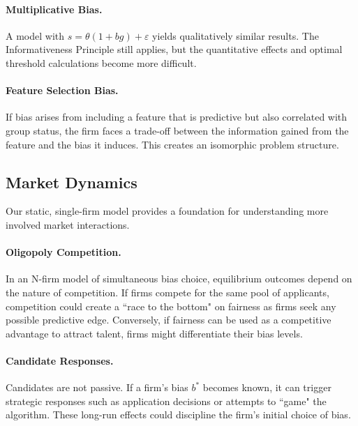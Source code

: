 \paragraph{Multiplicative Bias.} A model with $s = \theta(1+bg) + \varepsilon$ yields qualitatively similar results. The Informativeness Principle still applies, but the quantitative effects and optimal threshold calculations become more difficult.

\paragraph{Feature Selection Bias.} If bias arises from including a feature that is predictive but also correlated with group status, the firm faces a trade-off between the information gained from the feature and the bias it induces. This creates an isomorphic problem structure.

\subsection{Market Dynamics}
Our static, single-firm model provides a foundation for understanding more involved market interactions.

\paragraph{Oligopoly Competition.} In an N-firm model of simultaneous bias choice, equilibrium outcomes depend on the nature of competition. If firms compete for the same pool of applicants, competition could create a ``race to the bottom" on fairness as firms seek any possible predictive edge. Conversely, if fairness can be used as a competitive advantage to attract talent, firms might differentiate their bias levels.

\paragraph{Candidate Responses.} Candidates are not passive. If a firm's bias $b^*$ becomes known, it can trigger strategic responses such as application decisions or attempts to ``game" the algorithm. These long-run effects could discipline the firm's initial choice of bias.